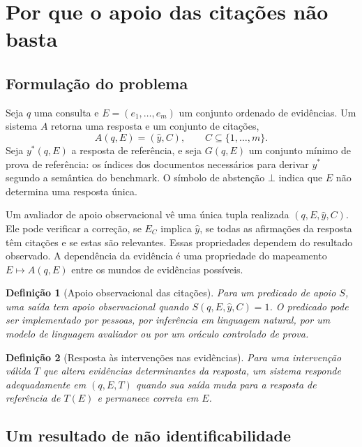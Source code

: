 \documentclass[10pt,twocolumn]{article}
\newtheorem{definition}{Definição}
\newcommand{\botans}{\bot}
\begin{document}
\section{Por que o apoio das citações não basta}

\subsection{Formulação do problema}

Seja $q$ uma consulta e $E=(e_1,\ldots,e_m)$ um conjunto ordenado de evidências. Um sistema $A$ retorna uma resposta e um conjunto de citações,
\begin{equation}
    A(q,E)=(\hat y, C), \qquad C\subseteq\{1,\ldots,m\}.
\end{equation}
Seja $y^*(q,E)$ a resposta de referência, e seja $G(q,E)$ um conjunto mínimo de prova de referência: os índices dos documentos necessários para derivar $y^*$ segundo a semântica do benchmark. O símbolo de abstenção $\botans$ indica que $E$ não determina uma resposta única.

Um avaliador de apoio observacional vê uma única tupla realizada $(q,E,\hat y,C)$. Ele pode verificar a correção, se $E_C$ implica $\hat y$, se todas as afirmações da resposta têm citações e se estas são relevantes. Essas propriedades dependem do resultado observado. A dependência da evidência é uma propriedade do mapeamento $E\mapsto A(q,E)$ entre os mundos de evidências possíveis.

\begin{definition}[Apoio observacional das citações]
Para um predicado de apoio $S$, uma saída tem apoio observacional quando $S(q,E,\hat y,C)=1$. O predicado pode ser implementado por pessoas, por inferência em linguagem natural, por um modelo de linguagem avaliador ou por um oráculo controlado de prova.
\end{definition}

\begin{definition}[Resposta às intervenções nas evidências]
Para uma intervenção válida $T$ que altera evidências determinantes da resposta, um sistema responde adequadamente em $(q,E,T)$ quando sua saída muda para a resposta de referência de $T(E)$ e permanece correta em $E$.
\end{definition}

\subsection{Um resultado de não identificabilidade}
\end{document}
